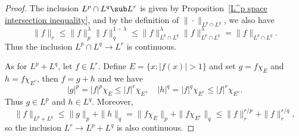 \begin{proof}
The inclusion $L^p\cap L^q\sub L^r$ is given by Proposition~\ref{L^p space intersection inequality}, and by the definition of $\|\cdot\|_{L^p\cap L^q}$, we also have
\[\|f\|_r\leq\|f\|_p^{\lambda}\|f\|_q^{1-\lambda}\leq\|f\|_{L^p\cap L^q}^{\lambda}\|f\|_{L^p\cap L^q}^{\lambda}=\|f\|_{L^p\cap L^q}.\]
Thus the inclusion $L^p\cap L^q\to L^r$ is continuous.\par
As for $L^p+L^q$, let $f\in L^r$. Define $E=\{x:|f(x)|>1\}$ and set $g=f\chi_E$ and $h=f\chi_{E^c}$, then $f=g+h$ and we have
\[|g|^p=|f|^p\chi_E\leq|f|^r\chi_E,\quad |h|^q=|f|^q\chi_{E^c}\leq|f|^r\chi_{E^c}.\]
Thus $g\in L^p$ and $h\in L^q$. Moreover,
\[\|f\|_{L^p+L^q}\leq\|g\|_p+\|h\|_q=\|f\chi_E\|_p+\|f\chi_{E^c}\|_q\leq\|f\|_r^{r/p}+\|f\|_r^{r/q},\]
so the inclusion $L^r\to L^p+L^q$ is also continuous.
\end{proof}
